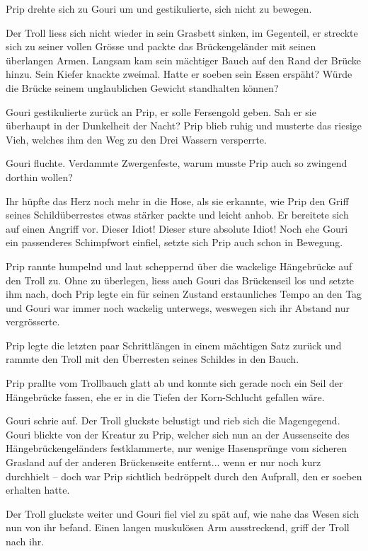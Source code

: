 \documentclass[10pt, a4paper, oneside]{book}
\begin{document}
Prip drehte sich zu Gouri um und gestikulierte, sich nicht zu bewegen.

Der Troll liess sich nicht wieder in sein Grasbett sinken, im Gegenteil, er streckte sich zu seiner vollen Grösse und packte das Brückengeländer mit seinen überlangen Armen. Langsam kam sein mächtiger Bauch auf den Rand der Brücke hinzu. Sein Kiefer knackte zweimal. Hatte er soeben sein Essen erspäht? Würde die Brücke seinem unglaublichen Gewicht standhalten können?

Gouri gestikulierte zurück an Prip, er solle Fersengold geben. Sah er sie überhaupt in der Dunkelheit der Nacht? Prip blieb ruhig und musterte das riesige Vieh, welches ihm den Weg zu den Drei Wassern versperrte.

Gouri fluchte. Verdammte Zwergenfeste, warum musste Prip auch so zwingend dorthin wollen?

Ihr hüpfte das Herz noch mehr in die Hose, als sie erkannte, wie Prip den Griff seines Schildüberrestes etwas stärker packte und leicht anhob. Er bereitete sich auf einen Angriff vor. Dieser Idiot! Dieser sture absolute Idiot! Noch ehe Gouri ein passenderes Schimpfwort einfiel, setzte sich Prip auch schon in Bewegung.

Prip rannte humpelnd und laut scheppernd über die wackelige Hängebrücke auf den Troll zu. Ohne zu überlegen, liess auch Gouri das Brückenseil los und setzte ihm nach, doch Prip legte ein für seinen Zustand erstaunliches Tempo an den Tag und Gouri war immer noch wackelig unterwegs, weswegen sich ihr Abstand nur vergrösserte.

Prip legte die letzten paar Schrittlängen in einem mächtigen Satz zurück und rammte den Troll mit den Überresten seines Schildes in den Bauch.

Prip prallte vom Trollbauch glatt ab und konnte sich gerade noch ein Seil der Hängebrücke fassen, ehe er in die Tiefen der Korn-Schlucht gefallen wäre.

Gouri schrie auf. Der Troll gluckste belustigt und rieb sich die Magengegend. Gouri blickte von der Kreatur zu Prip, welcher sich nun an der Aussenseite des Hängebrückengeländers festklammerte, nur wenige Hasensprünge vom sicheren Grasland auf der anderen Brückenseite entfernt... wenn er nur noch kurz durchhielt – doch war Prip sichtlich bedröppelt durch den Aufprall, den er soeben erhalten hatte.

Der Troll gluckste weiter und Gouri fiel viel zu spät auf, wie nahe das Wesen sich nun von ihr befand. Einen langen muskulösen Arm ausstreckend, griff der Troll nach ihr.
\end{document}
